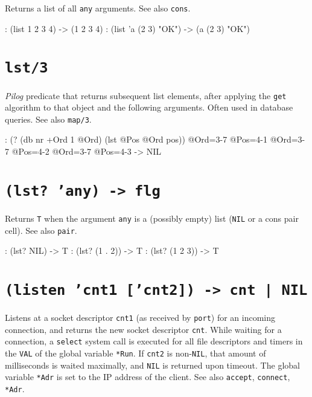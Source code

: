 Returns a list of all \texttt{any} arguments. See also \texttt{cons}.


\begin{wideverbatim}
: (list 1 2 3 4)
-> (1 2 3 4)
: (list 'a (2 3) "OK")
-> (a (2 3) "OK")
\end{wideverbatim}

 
\section*{\texttt{lst/3}}
\label{sec:func-ref-L-lst/3}


\emph{Pilog} predicate that returns subsequent list
elements, after applying the \texttt{get} algorithm to that object and the
following arguments. Often used in database queries. See also \texttt{map/3}.


\begin{wideverbatim}
: (? (db nr +Ord 1 @Ord) (lst @Pos @Ord pos))
 @Ord={3-7} @Pos={4-1}
 @Ord={3-7} @Pos={4-2}
 @Ord={3-7} @Pos={4-3}
-> NIL
\end{wideverbatim}

 
\section*{\texttt{(lst? 'any) -> flg}}
\label{sec:func-ref-L-(lst? 'any) -> flg}


Returns \texttt{T} when the argument \texttt{any} is a (possibly empty) list (\texttt{NIL} or
a cons pair cell). See also \texttt{pair}.


\begin{wideverbatim}
: (lst? NIL)
-> T
: (lst? (1 . 2))
-> T
: (lst? (1 2 3))
-> T
\end{wideverbatim}

 
\section*{\texttt{(listen 'cnt1 ['cnt2]) -> cnt | NIL}}
\label{sec:func-ref-L-(listen 'cnt1 ['cnt2]) -> cnt | NIL}


Listens at a socket descriptor \texttt{cnt1} (as received by \texttt{port}) for an
incoming connection, and returns the new socket descriptor \texttt{cnt}. While
waiting for a connection, a \texttt{select} system call is executed for all
file descriptors and timers in the \texttt{VAL} of the global variable \texttt{*Run}.
If \texttt{cnt2} is non-\texttt{NIL}, that amount of milliseconds is waited maximally,
and \texttt{NIL} is returned upon timeout. The global variable \texttt{*Adr} is set to
the IP address of the client. See also \texttt{accept}, \texttt{connect}, \texttt{*Adr}.


